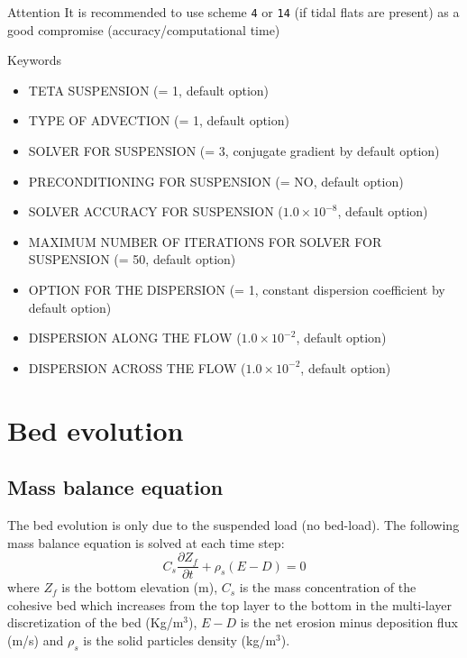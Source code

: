 \medskip
\begin{bclogo}[couleur = blue!10, arrondi = 0.10, logo = \bcattention]{\textsf{Attention}}
It is recommended to use scheme \texttt{4} or \texttt{14} (if tidal flats are present) as a good
compromise (accuracy/computational time)

\end{bclogo}

\medskip
\begin{bclogo}[couleur=blue!10,arrondi=0.1, logo=\bcinfo]{Keywords}
\begin{itemize}
\item {\ttfamily TETA SUSPENSION} ({\ttfamily = 1}, default option)
\item {\ttfamily TYPE OF ADVECTION} ({\ttfamily = 1}, default option)
\item {\ttfamily SOLVER FOR SUSPENSION} ({\ttfamily = 3}, conjugate gradient by default option)
\item {\ttfamily PRECONDITIONING FOR SUSPENSION} ({\ttfamily = NO}, default option)
\item {\ttfamily SOLVER ACCURACY FOR SUSPENSION} ($1.0\times 10^{-8}$, default option)
\item {\ttfamily MAXIMUM NUMBER OF ITERATIONS FOR SOLVER FOR
SUSPENSION} ({\ttfamily = 50}, default option)
\item {\ttfamily OPTION FOR THE DISPERSION} ({\ttfamily = 1}, constant
dispersion coefficient by default option)
\item {\ttfamily DISPERSION ALONG THE FLOW} ($1.0\times 10^{-2}$, default option)
\item {\ttfamily DISPERSION ACROSS THE FLOW} ($1.0\times 10^{-2}$, default option)
\end{itemize}
\end{bclogo}


\section{Bed evolution}

\subsection{Mass balance equation}



The bed evolution
is only due to the suspended load (no bed-load). The following mass balance equation is 
solved at each time step:
\begin{equation}
C_s \frac{\partial Z_f}{\partial t} + \rho_s (E-D) = 0 
\end{equation}%
where $Z_f$ is the bottom elevation (m), $C_s$ is the mass concentration of the cohesive
bed which increases from the top layer to the bottom in the multi-layer
discretization of the bed (Kg/m$^3$), $E-D$ is the net erosion minus deposition flux (m/s) and 
$\rho_s$ is the solid particles density (kg/m$^3$).

